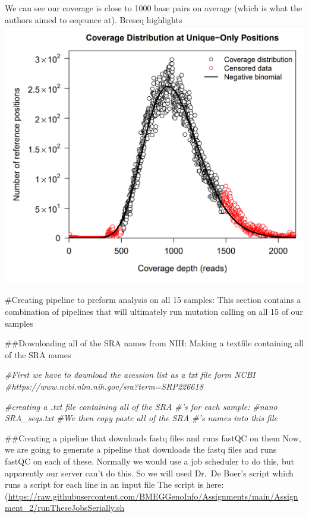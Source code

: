 \documentclass[
]{article}
\newenvironment{Shaded}{\begin{snugshade}}{\end{snugshade}}
\newcommand{\CommentTok}[1]{\textcolor[rgb]{0.56,0.35,0.01}{\textit{#1}}}
\begin{document}
We can see our coverage is close to 1000 base pairs on average (which is
what the authors aimed to seqeunce at). Breseq highlights
\includegraphics{Coverage_example.png}

\#Creating pipeline to preform analysis on all 15 samples: This section
contains a combination of pipelines that will ultimately run mutation
calling on all 15 of our samples

\#\#Downloading all of the SRA names from NIH: Making a textfile
containing all of the SRA names

\begin{Shaded}
\begin{Highlighting}[]
\CommentTok{#First we have to download the acession list as a txt file form NCBI}
\CommentTok{#https://www.ncbi.nlm.nih.gov/sra?term=SRP226618}

\CommentTok{#creating a .txt file containing all of the SRA #'s for each sample: }
\CommentTok{#nano SRA_seqs.txt }
\CommentTok{#We then copy paste all of the SRA #'s names into this file }
\end{Highlighting}
\end{Shaded}

\#\#Creating a pipeline that downloads fastq files and runs fastQC on
them Now, we are going to generate a pipeline that downloads the fastq
files and runs fastQC on each of these. Normally we would use a job
scheduler to do this, but apparently our server can't do this. So we
will used Dr.~De Boer's script which runs a script for each line in an
input file The script is here:
(\url{https://raw.githubusercontent.com/BMEGGenoInfo/Assignments/main/Assignment_2/runTheseJobsSerially.sh}
\end{document}
